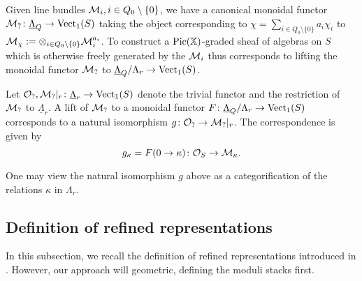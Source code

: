 \documentclass[12pt]{amsart}
\begin{document}
Given line bundles $\mathcal{M}_i, i \in Q_0 \setminus \{0\}$, we have a canonical monoidal functor $\mathcal{M}_? \colon\underline{\Lambda}_{Q} \rightarrow \operatorname{Vect}_1(S)$ taking the object corresponding to $\chi = \sum_{i \in Q_0\setminus \{0\}} a_i \chi_i$ to $\mathcal{M}_{\chi}:=\otimes_{i \in Q_0 \setminus \{0\}} \mathcal{M}_i^{a_i}$. To construct a $\operatorname{Pic}(\mathbb{X})$-graded sheaf of algebras on $S$ which is otherwise freely generated by the $\mathcal{M}_i$ thus corresponds to lifting the monoidal functor $\mathcal{M}_{?}$ to $\underline{\Lambda}_Q/\Lambda_r \to \operatorname{Vect}_1(S)$. 

\begin{proposition}  \label{prop:lifttomodLambdar}
Let $\mathcal{O}_?, \mathcal{M}_?|_r \colon \underline{\Lambda}_r \to \operatorname{Vect}_1(S)$ denote the trivial functor and the restriction of $\mathcal{M}_?$ to $\underline{\Lambda}_r$. A lift of $\mathcal{M}_?$ to a monoidal functor  $F \colon \underline{\Lambda}_Q/\Lambda_r \to \operatorname{Vect}_1(S)$ corresponds to a natural isomorphism $g \colon \mathcal{O}_? \to \mathcal{M}_?|_r$. The correspondence is given by 
$$ g_{\kappa}= F(0 \to \kappa) \colon \mathcal{O}_S \to \mathcal{M}_{\kappa}.$$
\end{proposition}
One may view the natural isomorphism $g$ above as a categorification of the relations $\kappa$ in $\Lambda_r$. 


\subsection{Definition of refined representations} \label{ssec:refined}

In this subsection, we recall the definition of refined representations introduced in \cite[Definition~3.2]{Abd}. 
However, our approach will geometric, defining the moduli stacks first. 
\end{document}
